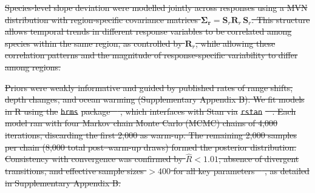 \documentclass[9pt,twocolumn,twoside]{pnas-new}
\providecommand{\DIFdel}[1]{{\protect\color{red}\sout{#1}}} %
\providecommand{\DIFdelend}{} %
\begin{document}
{%
\DIFdel{Species-level slope deviation were modelled jointly across responses using a MVN distribution with region-specific covariance matrices $\boldsymbol{\Sigma_r} = \mathbf{S}_{r}\mathbf{R}_{r}\,\mathbf{S}_{r}$. This structure allows temporal trends in different response variables to be correlated among species within the same region, as controlled by $\mathbf{R}_{r}$, while allowing these correlation patterns and the magnitude of response-specific variability to differ among regions.
}%

\DIFdel{Priors were weakly informative and guided by published rates of range shifts, depth changes, and ocean warming (Supplementary Appendix B). We fit models in R using the }\texttt{\DIFdel{brms}} %
\DIFdel{package \mbox{%
\citep{burkner_brms_2017}}\hskip0pt%
, which interfaces with Stan via }\texttt{\DIFdel{rstan}} %
\DIFdel{\mbox{%
\citep{stan2024,stan_development_team_rstan_2024}}\hskip0pt%
. Each model ran with four Markov chain Monte Carlo (MCMC) chains of 4,000 iterations, discarding the first 2,000 as warm-up. The remaining 2,000 samples per chain (8,000 total post–warm-up draws) formed the posterior distribution. Consistency with convergence was confirmed by $\hat{R} < 1.01$, absence of divergent transitions, and effective sample sizes $> 400$ for all key parameters \mbox{%
\citep{vehtari_rank-normalization_2021}}\hskip0pt%
, as detailed in Supplementary Appendix B.
}%

}

\DIFdelend \showmatmethods{} %

\end{document}

